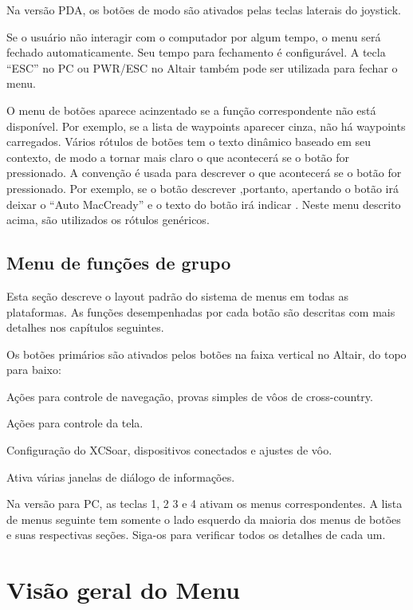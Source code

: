 Na versão PDA, os botões de modo são ativados pelas teclas laterais do joystick.

Se o usuário não interagir com o computador por algum tempo, o menu será fechado automaticamente.  Seu tempo para fechamento é configurável.  A tecla “ESC” no PC ou PWR/ESC no Altair também pode ser utilizada para fechar o menu.

O menu de botões aparece acinzentado se a função correspondente não está disponível.  Por exemplo, se a lista de waypoints aparecer cinza, não há waypoints carregados.
Vários rótulos de botões tem o texto dinâmico baseado em seu contexto, de modo a tornar mais claro o que acontecerá se o botão for pressionado.  A convenção é usada para descrever o que acontecerá se o botão for pressionado. Por exemplo, se o botão descrever ,portanto, apertando o botão irá deixar o “Auto MacCready” e o texto do botão irá indicar . 
Neste menu descrito acima, são utilizados os rótulos genéricos. 

\subsection*{Menu de funções de grupo}
Esta seção descreve o layout padrão do sistema de menus em todas as plataformas.  As funções desempenhadas por cada botão são descritas com mais detalhes nos capítulos seguintes.

Os botões primários são ativados pelos botões na faixa vertical no Altair, do topo para baixo:

\begin{jspecs}
\item[\bmenug{Nav}] Ações para controle de navegação, provas simples de vôos de cross-country.
\item[\bmenug{Display}]Ações para controle da tela.
\item[\bmenug{Config}] Configuração do XCSoar, dispositivos conectados e ajustes de vôo.
\item[\bmenug{Info}] Ativa várias janelas de diálogo de informações.
\end{jspecs}

Na versão para PC, as teclas 1, 2 3 e 4 ativam os menus correspondentes.  A lista de menus seguinte tem somente o lado esquerdo da maioria dos menus de botões e suas respectivas seções.  Siga-os para verificar todos os detalhes de cada um.

\section{Visão geral do Menu}

